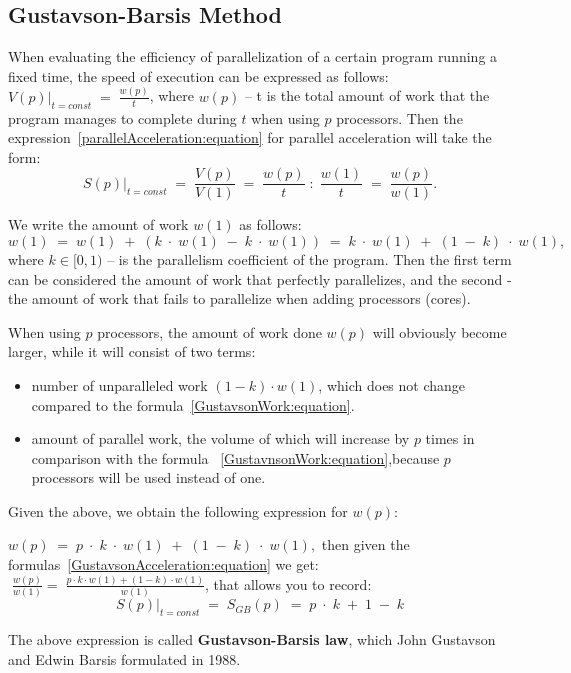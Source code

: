{ %
	\subsection{Gustavson-Barsis Method}
	\par When evaluating the efficiency of parallelization of a certain program running a fixed time, the speed of execution can be expressed as follows: $\left.V(p)\right|_{t=const}\;=\;\frac {w(p)}t$, where $w(p)$ – t is the total amount of work that the program manages to complete during $ t $ when using $p$ processors. Then the expression~\eqref{parallelAcceleration:equation} for parallel acceleration will take the form:
	\begin{equation}
		\label{GustavsonAcceleration:equation}
		\left.S(p)\right|_{t=const}\;=\;\frac{V(p)}{V(1)}\;=\;\frac{w(p)}t\;:\;\frac{w(1)}t\;=\;\frac{w(p)}{w(1)}.
	\end{equation}
	\par We write the amount of work $w (1)$ as follows:
	\begin{equation}
		\label{GustavsonWork:equation}
		w(1)\;=\;w(1)\;+\;(k\;\cdot\;w(1)\;-\;k\;\cdot\;w(1))\;=\;k\;\cdot\;w(1)\;+\;(1\;-\;k)\;\cdot\;w(1),
	\end{equation}
	where $k\in\lbrack0,1)$ – is the parallelism coefficient of the program. Then the first term can be considered the amount of work that perfectly parallelizes, and the second - the amount of work that fails to parallelize when adding processors (cores).
	\par When using $p$ processors, the amount of work done $w(p)$ will obviously become larger, while it will consist of two terms:
	\begin{itemize}
		\item number of unparalleled work $(1-k)\cdot w(1)$, which does not change compared to the formula~\eqref{GustavsonWork:equation}.
		\item amount of parallel work, the volume of which will increase by $p$ times in comparison with the formula ~\eqref{GustavnsonWork:equation},because $p$ processors will be used instead of one.
	\end{itemize}
	\par Given the above, we obtain the following expression for $w(p)$:
	\par$w(p)\;=\;p\;\cdot\;k\;\cdot\;w(1)\;+\;(1\;-\;k)\;\cdot\;w(1),$ then given the formulas~\eqref{GustavsonAcceleration:equation} we get: $\;\frac{w(p)}{w(1)}=\;\frac{p\cdot k\cdot w(1)+(1-k)\cdot w(1)}{w(1)}$, that allows you to record:
	\begin{equation}
		\left.S(p)\right|_{t=const}\;=\;S_{GB}(p)\;=\;p\;\cdot\;k\;+\;1\;-\;k
	\end{equation}
	\par The above expression is called \textbf {Gustavson-Barsis law}, which John Gustavson and Edwin Barsis formulated in 1988.
	\par
}